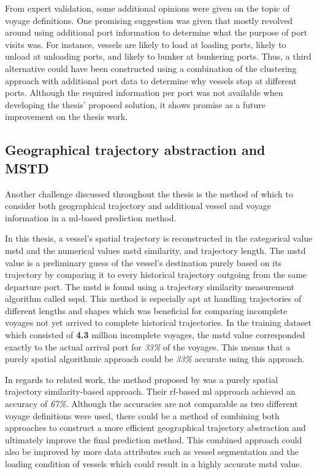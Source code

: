 From expert validation, some additional opinions were given on the topic of voyage definitions. One promising suggestion was given that mostly revolved around using additional port information to determine what the purpose of port visits was. For instance, vessels are likely to load at loading ports, likely to unload at unloading ports, and likely to bunker at bunkering ports. Thus, a third alternative could have been constructed using a combination of the clustering approach with additional port data to determine why vessels stop at different ports. Although the required information per port was not available when developing the thesis' proposed solution, it shows promise as a future improvement on the thesis work.

\subsection{Geographical trajectory abstraction and MSTD}

Another challenge discussed throughout the thesis is the method of which to consider both geographical trajectory and additional vessel and voyage information in a \acrfull{ml}-based prediction method.

In this thesis, a vessel's spatial trajectory is reconstructed in the categorical value \acrfull{mstd} and the numerical values \acrshort{mstd} similarity, and trajectory length. The \acrshort{mstd} value is a preliminary guess of the vessel's destination purely based on its trajectory by comparing it to every historical trajectory outgoing from the same departure port. The \acrshort{mstd} is found using a trajectory similarity measurement algorithm called \acrfull{sspd}. This method is especially apt at handling trajectories of different lengths and shapes which was beneficial for comparing incomplete voyages not yet arrived to complete historical trajectories. In the training dataset which consisted of \textbf{4.3} million incomplete voyages, the \acrshort{mstd} value corresponded exactly to the actual arrival port for \textit{33\%} of the voyages. This means that a purely spatial algorithmic approach could be \textit{33\%} accurate using this approach.

In regards to related work, the method proposed by \cite{Zhang2020AISApproach} was a purely spatial trajectory similarity-based approach. Their \acrfull{rf}-based \acrshort{ml} approach achieved an accuracy of \textit{67\%}. Although the accuracies are not comparable as two different voyage definitions were used, there could be a method of combining both approaches to construct a more efficient geographical trajectory abstraction and ultimately improve the final prediction method. This combined approach could also be improved by more data attributes such as vessel segmentation and the loading condition of vessels which could result in a highly accurate \acrshort{mstd} value.

